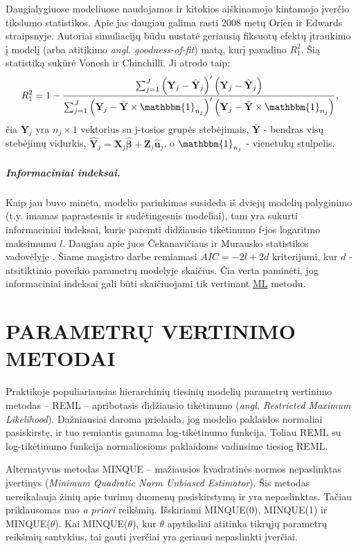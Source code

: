 \documentclass[11pt,a4paper]{article}
\begin{document}
\indent Daugialygiuose modeliuose naudojamos ir kitokios aiškinamojo kintamojo įverčio tikslumo statistikos. Apie jas daugiau galima rasti 2008 metų Orien ir Edwards\cite{fixedTest} straipsnyje. Autoriai simuliacijų būdu nustatė geriausią fiksuotų efektų įtraukimo į modelį (arba atitikimo \textit{angl. goodness-of-fit}) matą, kurį pavadino $R^2_1$. Šią statistiką sukūrė Vonesh ir Chinchilli\cite{Rtest}. Ji atrodo taip:
\begin{equation*} \label{eq:r2}
R^2_1=1-\dfrac{\sum^J_{j=1}\left(\mathbf{Y}_{j}-\hat{\mathbf{Y}}_{j}\right)'\left(\mathbf{Y}_{j}-\hat{\mathbf{Y}}_{j}\right)}{\sum^J_{j=1}\left(\mathbf{Y}_{j}-\bar{\mathbf{Y}}\times\mathbbm{1}_{n_j}\right)'\left(\mathbf{Y}_{j}-\bar{\mathbf{Y}}\times\mathbbm{1}_{n_j}\right)},
\end{equation*}
čia $\mathbf{Y}_j$ yra $n_j\times1$ vektorius su j-tosios grupės stebėjimais, $\bar{\mathbf{Y}}$ - bendras visų stebėjimų vidurkis, $\hat{\mathbf{Y}}_j=\mathbf{X}_j\hat{\boldsymbol{\beta}}+\mathbf{Z}_j\hat{\mathbf{u}}_j$, o $\mathbbm{1}_{n_j}$ - vienetukų stulpelis.

\subparagraph{Informaciniai indeksai.} Kaip jau buvo minėta, modelio parinkimas susideda iš dviejų modelių palyginimo (t.y. imamas paprastesnis ir sudėtingesnis modeliai), tam yra sukurti informaciniai indeksai, kurie paremti didžiausio tikėtinumo f-jos logaritmo maksimumu $l$. Daugiau apie juos Čekanavičiaus ir Murausko statistikos vadovėlyje \cite{cek}. Šiame magistro darbe remiamasi $AIC=-2l+2d$ kriterijumi, kur $d$ - atsitiktinio poveikio parametrų modelyje skaičius. Čia verta paminėti, jog informaciniai indeksai gali būti skaičiuojami tik vertinant \hyperlink{reml}{ML} metodu.

\newpage
\section{PARAMETRŲ VERTINIMO METODAI} \label{sec:vert}
\indent Praktikoje populiariausias hierarchinių tiesinių modelių parametrų vertinimo metodas -- REML -- apribotasis didžiausio tikėtinumo (\textit{angl. Restricted Maximum Likelihood}). Dažniausiai daroma prielaida, jog modelio paklaidos normaliai pasiskirstę, ir tuo remiantis gaunama log-tikėtinumo funkcija. Toliau REML su log-tikėtinumo funkcija normaliosioms paklaidoms vadinsime tiesiog REML. 

\indent Alternatyvus metodas MINQUE -- mažiausios kvadratinės normos nepaslinktas įvertinys (\textit{Minimum Quadratic Norm Unbiased Estimator}). Šis metodas nereikalauja žinių apie turimų duomenų pasiskirstymą ir yra nepaslinktas. Tačiau priklausomas nuo \textit{a priori} reikšmių. Išskiriami MINQUE(0), MINQUE(1) ir MINQUE($\theta$). Kai MINQUE($\theta$), kur $\theta$ apytiksliai atitinka tikrųjų parametrų reikšmių santykius, tai gauti įverčiai yra geriausi nepaslinkti įverčiai.
\end{document}
